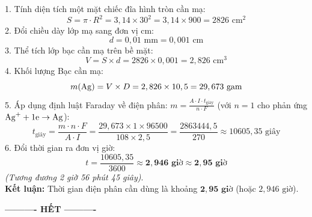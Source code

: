 \documentclass[11pt,a4paper]{article}
\begin{document}
\begin{tcolorbox}[colback=tableGreen!30,colframe=mainGreen!70,title=\textbf{Hướng dẫn giải chi tiết Câu 3},fonttitle=\bfseries]
1. Tính diện tích một mặt chiếc đĩa hình tròn cần mạ:
\[
S = \pi \cdot R^2 = 3,14 \times 30^2 = 3,14 \times 900 = 2826\text{ cm}^2
\]
2. Đổi chiều dày lớp mạ sang đơn vị cm:
\[
d = 0,01\text{ mm} = 0,001\text{ cm}
\]
3. Thể tích lớp bạc cần mạ trên bề mặt:
\[
V = S \times d = 2826 \times 0,001 = 2,826\text{ cm}^3
\]
4. Khối lượng Bạc cần mạ:
\[
m(\ce{Ag}) = V \times D = 2,826 \times 10,5 = 29,673\text{ gam}
\]
5. Áp dụng định luật Faraday về điện phân: $m = \frac{A \cdot I \cdot t_\text{giây}}{n \cdot F}$ (với $n = 1$ cho phản ứng $\ce{Ag+} + 1\ce{e} \to \ce{Ag}$):
\[
t_\text{giây} = \frac{m \cdot n \cdot F}{A \cdot I} = \frac{29,673 \times 1 \times 96500}{108 \times 2,5} = \frac{2863444,5}{270} \approx 10605,35\text{ giây}
\]
6. Đổi thời gian ra đơn vị giờ:
\[
t = \frac{10605,35}{3600} \approx \mathbf{2,946\text{ giờ}} \approx \mathbf{2,95\text{ giờ}}
\]
\textit{(Tương đương 2 giờ 56 phút 45 giây)}.\\
\textbf{Kết luận:} Thời gian điện phân cần dùng là khoảng $\mathbf{2,95\text{ giờ}}$ (hoặc $2,946\text{ giờ}$).
\end{tcolorbox}

\vfill
\begin{center}
\textbf{---------- HẾT ----------}
\end{center}
\end{document}
